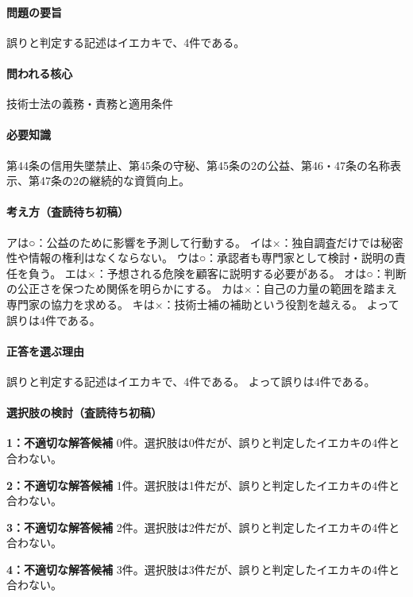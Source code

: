 \paragraph{問題の要旨} 誤りと判定する記述はイエカキで、4件である。

\paragraph{問われる核心} 技術士法の義務・責務と適用条件

\paragraph{必要知識} 第44条の信用失墜禁止、第45条の守秘、第45条の2の公益、第46・47条の名称表示、第47条の2の継続的な資質向上。

\paragraph{考え方（査読待ち初稿）} アは○：公益のために影響を予測して行動する。 イは×：独自調査だけでは秘密性や情報の権利はなくならない。 ウは○：承認者も専門家として検討・説明の責任を負う。 エは×：予想される危険を顧客に説明する必要がある。 オは○：判断の公正さを保つため関係を明らかにする。 カは×：自己の力量の範囲を踏まえ専門家の協力を求める。 キは×：技術士補の補助という役割を越える。 よって誤りは4件である。

\paragraph{正答を選ぶ理由} 誤りと判定する記述はイエカキで、4件である。  よって誤りは4件である。

\paragraph{選択肢の検討（査読待ち初稿）}

\noindent\textbf{1：不適切な解答候補} 0件。選択肢は0件だが、誤りと判定したイエカキの4件と合わない。\par

\noindent\textbf{2：不適切な解答候補} 1件。選択肢は1件だが、誤りと判定したイエカキの4件と合わない。\par

\noindent\textbf{3：不適切な解答候補} 2件。選択肢は2件だが、誤りと判定したイエカキの4件と合わない。\par

\noindent\textbf{4：不適切な解答候補} 3件。選択肢は3件だが、誤りと判定したイエカキの4件と合わない。\par


